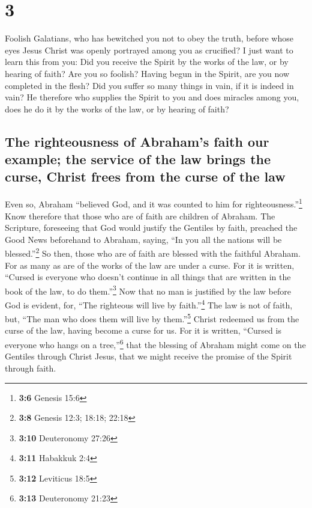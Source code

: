 \hypertarget{section-2}{%
\section{3}\label{section-2}}

 Foolish Galatians, who has bewitched you not to obey the
truth, before whose eyes Jesus Christ was openly portrayed among you as
crucified?  I just want to learn this from you: Did you
receive the Spirit by the works of the law, or by hearing of faith?
 Are you so foolish? Having begun in the Spirit, are you
now completed in the flesh?  Did you suffer so many things
in vain, if it is indeed in vain?  He therefore who
supplies the Spirit to you and does miracles among you, does he do it by
the works of the law, or by hearing of faith?

\hypertarget{the-righteousness-of-abrahams-faith-our-example-the-service-of-the-law-brings-the-curse-christ-frees-from-the-curse-of-the-law}{%
\subsection{The righteousness of Abraham's faith our example; the
service of the law brings the curse, Christ frees from the curse of the
law}\label{the-righteousness-of-abrahams-faith-our-example-the-service-of-the-law-brings-the-curse-christ-frees-from-the-curse-of-the-law}}

 Even so, Abraham ``believed God, and it was counted to
him for righteousness.''\footnote{\textbf{3:6} Genesis 15:6}
 Know therefore that those who are of faith are children
of Abraham.  The Scripture, foreseeing that God would
justify the Gentiles by faith, preached the Good News beforehand to
Abraham, saying, ``In you all the nations will be blessed.''\footnote{\textbf{3:8}
  Genesis 12:3; 18:18; 22:18}  So then, those who are of
faith are blessed with the faithful Abraham.  For as many
as are of the works of the law are under a curse. For it is written,
``Cursed is everyone who doesn't continue in all things that are written
in the book of the law, to do them.''\footnote{\textbf{3:10} Deuteronomy
  27:26}  Now that no man is justified by the law before
God is evident, for, ``The righteous will live by faith.''\footnote{\textbf{3:11}
  Habakkuk 2:4}  The law is not of faith, but, ``The man
who does them will live by them.''\footnote{\textbf{3:12} Leviticus 18:5}
 Christ redeemed us from the curse of the law, having
become a curse for us. For it is written, ``Cursed is everyone who hangs
on a tree,''\footnote{\textbf{3:13} Deuteronomy 21:23} 
that the blessing of Abraham might come on the Gentiles through Christ
Jesus, that we might receive the promise of the Spirit through faith.

